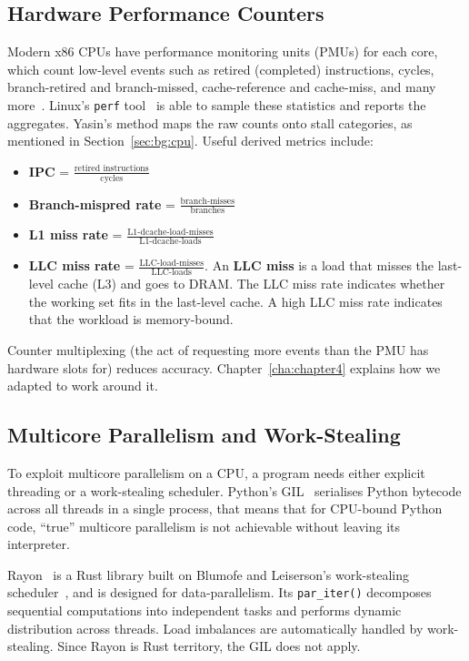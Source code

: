 \subsection{Hardware Performance Counters\label{sec:bg:perf}}

Modern x86 CPUs have performance monitoring units (PMUs) for each core, which count low-level events such as retired (completed) instructions, cycles, branch-retired and branch-missed, cache-reference and cache-miss, and many more~\cite{intel_optimization_manual}. Linux's \texttt{perf} tool~\cite{weaver_2013} is able to sample these statistics and reports the aggregates. Yasin's \cite{yasin_2014} method maps the raw counts onto stall categories, as mentioned in Section~\ref{sec:bg:cpu}. Useful derived metrics include:

\begin{itemize}
  \item \textbf{IPC} = $\frac{\text{retired instructions}}{\text{cycles}}$
  \item \textbf{Branch-mispred rate} = $\frac{\text{branch-misses}}{\text{branches}}$
  \item \textbf{L1 miss rate} = $\frac{\text{L1-dcache-load-misses}}{\text{L1-dcache-loads}}$
  \item \textbf{LLC miss rate} = $\frac{\text{LLC-load-misses}}{\text{LLC-loads}}$. An \textbf{LLC miss} is a load that misses the last-level cache (L3) and goes to DRAM. The LLC miss rate indicates whether the working set fits in the last-level cache. A high LLC miss rate indicates that the workload is memory-bound.
\end{itemize}

Counter multiplexing (the act of requesting more events than the PMU has hardware slots for) reduces accuracy. Chapter~\ref{cha:chapter4} explains how we adapted to work around it.


\subsection{Multicore Parallelism and Work-Stealing\label{sec:bg:rayon}}

To exploit multicore parallelism on a CPU, a program needs either explicit threading or a work-stealing scheduler. Python's GIL~\cite{cpython_gil} serialises Python bytecode across all threads in a single process, that means that for CPU-bound Python code, ``true'' multicore parallelism is not achievable without leaving its interpreter.

Rayon~\cite{rayon_lib} is a Rust library built on Blumofe and Leiserson's work-stealing scheduler~\cite{blumofe_leiserson_1999}, and is designed for data-parallelism. Its \texttt{par\_iter()} decomposes sequential computations into independent tasks and performs dynamic distribution across threads. Load imbalances are automatically handled by work-stealing. Since Rayon is Rust territory, the GIL does not apply.

